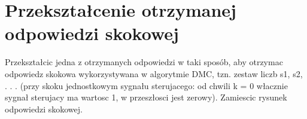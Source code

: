 \chapter{ Przekształcenie otrzymanej odpowiedzi skokowej }
Przekształcic jedna z otrzymanych odpowiedzi w taki sposób, aby otrzymac odpowiedz
skokowa wykorzystywana w algorytmie DMC, tzn. zestaw liczb s1, s2, . . . (przy skoku
jednostkowym sygnału sterujacego: od chwili k = 0 włacznie sygnał sterujacy ma
wartosc 1, w przeszłosci jest zerowy). Zamiescic rysunek odpowiedzi skokowej.